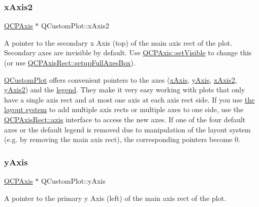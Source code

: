 \subsubsection{\texorpdfstring{x\+Axis2}{xAxis2}}
{\footnotesize\ttfamily \hyperlink{class_q_c_p_axis}{Q\+C\+P\+Axis} $\ast$ Q\+Custom\+Plot\+::x\+Axis2}

A pointer to the secondary x Axis (top) of the main axis rect of the plot. Secondary axes are invisible by default. Use \hyperlink{class_q_c_p_layerable_a3bed99ddc396b48ce3ebfdc0418744f8}{Q\+C\+P\+Axis\+::set\+Visible} to change this (or use \hyperlink{class_q_c_p_axis_rect_a5fa906175447b14206954f77fc7f1ef4}{Q\+C\+P\+Axis\+Rect\+::setup\+Full\+Axes\+Box}).

\hyperlink{class_q_custom_plot}{Q\+Custom\+Plot} offers convenient pointers to the axes (\hyperlink{class_q_custom_plot_a9a79cd0158a4c7f30cbc702f0fd800e4}{x\+Axis}, \hyperlink{class_q_custom_plot_af6fea5679725b152c14facd920b19367}{y\+Axis}, \hyperlink{class_q_custom_plot_ada41599f22cad901c030f3dcbdd82fd9}{x\+Axis2}, \hyperlink{class_q_custom_plot_af13fdc5bce7d0fabd640f13ba805c0b7}{y\+Axis2}) and the \hyperlink{class_q_custom_plot_a4eadcd237dc6a09938b68b16877fa6af}{legend}. They make it very easy working with plots that only have a single axis rect and at most one axis at each axis rect side. If you use \hyperlink{}{the layout system} to add multiple axis rects or multiple axes to one side, use the \hyperlink{class_q_c_p_axis_rect_a583ae4f6d78b601b732183f6cabecbe1}{Q\+C\+P\+Axis\+Rect\+::axis} interface to access the new axes. If one of the four default axes or the default legend is removed due to manipulation of the layout system (e.\+g. by removing the main axis rect), the corresponding pointers become 0. \hypertarget{class_q_custom_plot_af6fea5679725b152c14facd920b19367}{}\label{class_q_custom_plot_af6fea5679725b152c14facd920b19367} 
\subsubsection{\texorpdfstring{y\+Axis}{yAxis}}
{\footnotesize\ttfamily \hyperlink{class_q_c_p_axis}{Q\+C\+P\+Axis} $\ast$ Q\+Custom\+Plot\+::y\+Axis}

A pointer to the primary y Axis (left) of the main axis rect of the plot.

